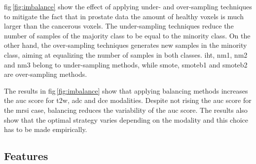 \documentclass[a4paper,num-refs]{wiley-article}
\begin{document}
\Acf{fig}\,\ref{fig:imbalance} show the effect of applying under- and
over-sampling techniques to mitigate the fact that in prostate data the amount
of healthy voxels is much larger than the cancerous voxels.
The under-sampling techniques reduce the number of samples of the majority class
to be equal to the minority class.
On the other hand, the over-sampling techniques generates new samples in the minority class, aiming at equalizing
the number of samples in both classes.
\ac{iht}, \ac{nm1}, \ac{nm2} and \ac{nm3} belong to under-sampling methods,
while \ac{smote}, \ac{smoteb1} and \ac{smoteb2} are over-sampling methods.

The results in \ac{fig}\,\ref{fig:imbalance} show that applying balancing
methods increases the \ac{auc} score for \ac{t2w}, \ac{adc} and \ac{dce}
modalities. Despite not rising the \ac{auc} score for the \ac{mrsi} case,
balancing reduces the variability of the \ac{auc} score. The results also show
that the optimal strategy varies depending on the modality and this choice has
to be made empirically.



\subsection{Features}
\label{sec:experiments:features}
\end{document}
